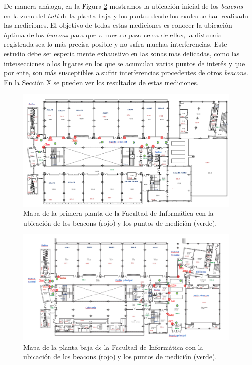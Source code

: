 De manera análoga, en la Figura \ref{fig:medidasPBaja} mostramos la ubicación inicial de los \textit{beacons} en la zona del \textit{hall} de la planta baja y los puntos desde los cuales se han realizado las mediciones. El objetivo de todas estas mediciones es conocer la ubicación óptima de los \textit{beacons} para que a nuestro paso cerca de ellos, la distancia registrada sea lo más precisa posible y no sufra muchas interferencias. Este estudio debe ser especialmente exhaustivo en las zonas más delicadas, como las intersecciones o los lugares en los que se acumulan varios puntos de interés y que por ente, son más susceptibles a sufrir interferencias procedentes de otros \textit{beacons}. En la Sección X se pueden ver los resultados de estas mediciones. 


\begin{figure}[t]
	\centering
	\includegraphics[width=1\textwidth]{Imagenes/Descripciondeltrabajo/mapa_mediciones_planta1}
	\caption{Mapa de la primera planta de la Facultad de Informática con la ubicación de los beacons (rojo) y los puntos de medición (verde). }
	\label{fig:medidasPPrimera}
\end{figure}

\begin{figure}[!h]
	\centering
	\includegraphics[width=1\textwidth]{Imagenes/Descripciondeltrabajo/mapa_mediciones_plantabaja}
	\caption{Mapa de la planta baja de la Facultad de Informática con la ubicación de los beacons (rojo) y los puntos de medición (verde). }
	\label{fig:medidasPBaja}
\end{figure}


